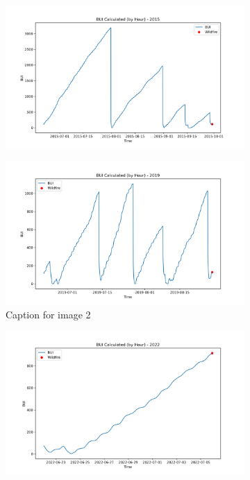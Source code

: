 \begin{figure}[h]
	\centering
	\caption{Calculated hourly BUI value for 2015, 2019, and 2022}
	\begin{subfigure}{0.45\textwidth}
		\centering
		\includegraphics[width=\textwidth]{graphs/2015/byHour/2015CalcBUI12.png}
	\end{subfigure}
	\hfill
	\begin{subfigure}{0.45\textwidth}
		\centering
		\includegraphics[width=\textwidth]{graphs/2019/2019CalcBUI12.png}
		\caption{Caption for image 2}
		\label{fig:img2}
	\end{subfigure}
	\hfill
	\begin{subfigure}{0.45\textwidth}
		\centering
		\includegraphics[width=\textwidth]{graphs/2022/2022CalcBUI12.png}
	\end{subfigure}
	
	\label{fig:hourly_bui}
\end{figure}

